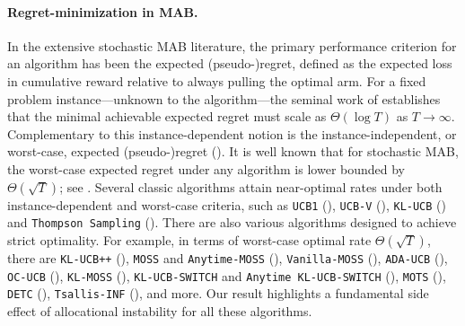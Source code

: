 \documentclass[nonblindrev]{informs3_noinforms}
\begin{document}
\paragraph{Regret-minimization in MAB.}
In the extensive stochastic MAB literature, the primary performance criterion for an algorithm has been the expected (pseudo-)regret, defined as the expected loss in cumulative reward relative to always pulling the optimal arm. For a fixed problem instance—unknown to the algorithm—the seminal work of \cite{lai1985asymptotically} establishes that the minimal achievable expected regret must scale as $\Theta(\log T)$ as $T\rightarrow\infty$. Complementary to this instance-dependent notion is the instance-independent, or worst-case, expected (pseudo-)regret (\cite{lattimore2020bandit}). It is well known that for stochastic MAB, the worst-case expected regret under any algorithm is lower bounded by $\Theta(\sqrt{T})$; see \cite{auer2002finite}. Several classic algorithms attain near-optimal rates under both instance-dependent and worst-case criteria, such as \texttt{UCB1} (\cite{auer2002finite}), \texttt{UCB-V} (\cite{audibert2009exploration}), \texttt{KL-UCB} (\cite{garivier2011kl}) and \texttt{Thompson Sampling} (\cite{agrawal2012analysis, daniel2018tutorial}). There are also various algorithms designed to achieve strict optimality. For example, in terms of worst-case optimal rate $\Theta(\sqrt{T})$, there are \texttt{KL-UCB++} (\cite{menard2017minimax}), \texttt{MOSS} and \texttt{Anytime-MOSS} (\cite{audibert2009minimax}), \texttt{Vanilla-MOSS} (\cite{lattimore2020bandit}), \texttt{ADA-UCB} (\cite{lattimore2018refining}), \texttt{OC-UCB} (\cite{lattimore2015optimally}), \texttt{KL-MOSS} (\cite{praharaj2025instability}), \texttt{KL-UCB-SWITCH} and \texttt{Anytime KL-UCB-SWITCH} (\cite{garivier2022kl}), \texttt{MOTS} (\cite{jin2021mots}), \texttt{DETC} (\cite{jin2021double}), \texttt{Tsallis-INF} (\cite{zimmert2021tsallis}), and more. Our result highlights a fundamental side effect of allocational instability for all these algorithms.
\end{document}
